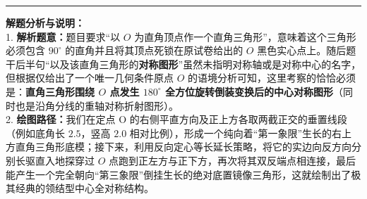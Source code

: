 \begin{center}
\end{center}

\vspace{0.6cm}
\hrule
\vspace{0.4cm}

{\small\color{gray}
\textbf{解题分析与说明：}\\
1. \textbf{解析题意：}题目要求“以 $O$ 为直角顶点作一个直角三角形”，意味着这个三角形必须包含 $90^\circ$ 的直角并且将其顶点死锁在原试卷给出的 $O$ 黑色实心点上。随后题干后半句“以及该直角三角形的\textbf{对称图形}”虽然未指明对称轴或是对称中心的名字，但根据仅给出了一个唯一几何条件原点 $O$ 的语境分析可知，这里考察的恰恰必须是：\textbf{直角三角形围绕 $O$ 点发生 $180^\circ$ 全方位旋转倒装变换后的中心对称图形}（同时也是沿角分线的重轴对称折射图形）。\\
2. \textbf{绘图路径：}我们在定点 O 的右侧平直方向及正上方各取两截正交的垂置线段（例如底角长 $2.5$，竖高 $2.0$ 相对比例），形成一个纯向着“第一象限”生长的右上方直角三角形底模；接下来，利用反向定心等长延长策略，将它的实边向反方向分别长驱直入地探穿过 $O$ 点跑到正左方与正下方，再次将其双反端点相连接，最后能产生一个完全朝向“第三象限”倒挂生长的绝对底置镜像三角形，这就绘制出了极其经典的领结型中心全对称结构。
}

